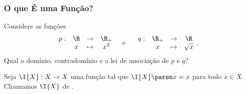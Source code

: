 \begin{frame}
\frametitle{O que É uma Função?} 
\begin{exemplo}
Considere as funções
$$\begin{array}{cccc}
p : & \R & \to     & \R_+ \\
		 &  x & \mapsto & x^2
\end{array}
\text{\ \ \  e \ \ \ }
\begin{array}{cccc}
q : & \R_+ & \to     & \R \\
		 &  x & \mapsto & \sqrt x
\end{array}.$$
Qual o domínio, contradomínio e a lei de associação de $p$ e $q$?
\end{exemplo}
\pause

\begin{exemplo}
Seja $\I{X} : X \to X $ uma função tal que $\I{X} \paren x = x$ para
todo $x \in X$. Chamamos $\I{X}$ de .
\end{exemplo}

\end{frame}


